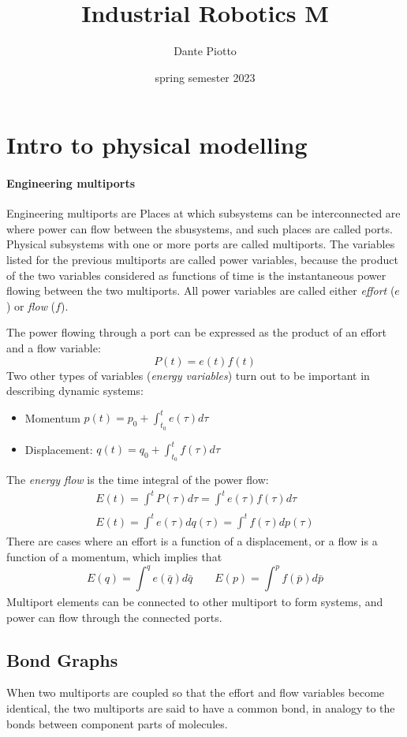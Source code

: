 \documentclass{book}
\title{Industrial Robotics M}
\author{Dante Piotto}
\date{spring semester 2023}
\begin{document}
\chapter{Intro to physical modelling}
\subsubsection{Engineering multiports}
Engineering multiports are Places at which subsystems can be interconnected are where power can flow between the sbusystems, and such places are called ports. Physical subsystems with one or more ports are called multiports. The variables listed for the previous multiports are called power variables, because the product of the two variables considered as functions of time is the instantaneous power flowing between the two multiports. All power variables are called either \emph{effort} ($e$) or \emph{flow} ($f$).

The power flowing through a port can be expressed as the product of an effort and a flow variable: 
\[
    P(t) = e(t)f(t)
\]
Two other types of variables (\emph{energy variables}) turn out to be important in describing dynamic systems: 
\begin{itemize}
    \item Momentum $p(t) = p_0 + \displaystyle\int_{t_0}^{t}e(\tau)d\tau$ 
    \item Displacement: $q(t) = q_0 + \displaystyle\int_{t_0}^{t}f(\tau)d\tau$ 
\end{itemize}
The \emph{energy flow} is the time integral of the power flow: 
\begin{gather*}
    E(t) = \displaystyle\int_{}^{t}P(\tau)d\tau = \displaystyle\int_{}^{t}e(\tau)f(\tau)d\tau \\
    E(t) = \displaystyle\int_{}^{t}e(\tau)dq(\tau) = \displaystyle\int_{}^{t}f(\tau)dp(\tau)
\end{gather*}
There are cases where an effort is a function of a displacement, or a flow is a function of a momentum, which implies that 
\[
    E(q) = \displaystyle\int_{}^{q}e(\bar{q})d\bar{q} \qquad E(p) = \displaystyle\int_{}^{p}f(\bar{p})d\bar{p}
\]
Multiport elements can be connected to other multiport to form systems, and power can flow through the connected ports. 

\section{Bond Graphs}
When two multiports are coupled so that the effort and flow variables become identical, the two multiports are said to have a common bond, in analogy to the bonds between component parts of molecules.
\end{document}
